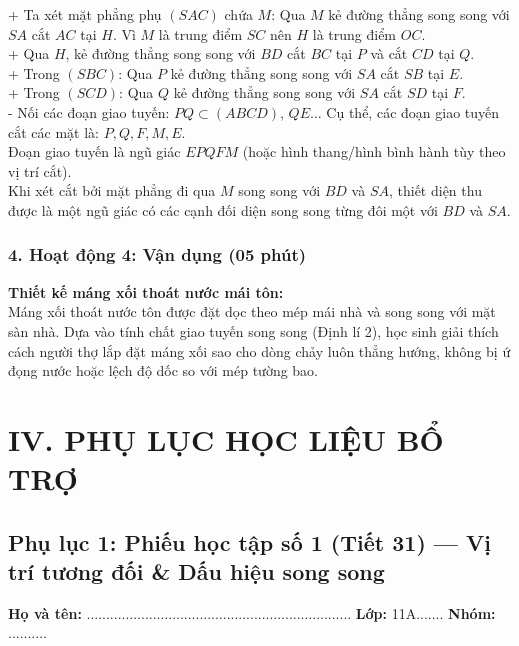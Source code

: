 \documentclass[12pt, a4paper]{article}
\begin{document}
\begin{itemize}
      + Ta xét mặt phẳng phụ $(SAC)$ chứa $M$: Qua $M$ kẻ đường thẳng song song với $SA$ cắt $AC$ tại $H$. Vì $M$ là trung điểm $SC$ nên $H$ là trung điểm $OC$.\\
      + Qua $H$, kẻ đường thẳng song song với $BD$ cắt $BC$ tại $P$ và cắt $CD$ tại $Q$.\\
      + Trong $(SBC)$: Qua $P$ kẻ đường thẳng song song với $SA$ cắt $SB$ tại $E$.\\
      + Trong $(SCD)$: Qua $Q$ kẻ đường thẳng song song với $SA$ cắt $SD$ tại $F$.\\
    - Nối các đoạn giao tuyến: $PQ \subset (ABCD)$, $QE \dots$ Cụ thể, các đoạn giao tuyến cắt các mặt là: $P, Q, F, M, E$.\\
    Đoạn giao tuyến là ngũ giác $EPQFM$ (hoặc hình thang/hình bình hành tùy theo vị trí cắt).\\
    Khi xét cắt bởi mặt phẳng đi qua $M$ song song với $BD$ và $SA$, thiết diện thu được là một ngũ giác có các cạnh đối diện song song từng đôi một với $BD$ và $SA$.
\end{itemize}

\subsubsection*{4. Hoạt động 4: Vận dụng (05 phút)}
\textbf{Thiết kế máng xối thoát nước mái tôn:}\\
Máng xối thoát nước tôn được đặt dọc theo mép mái nhà và song song với mặt sàn nhà. Dựa vào tính chất giao tuyến song song (Định lí 2), học sinh giải thích cách người thợ lắp đặt máng xối sao cho dòng chảy luôn thẳng hướng, không bị ứ đọng nước hoặc lệch độ dốc so với mép tường bao.

\newpage

\section*{IV. PHỤ LỤC HỌC LIỆU BỔ TRỢ}

\subsection*{Phụ lục 1: Phiếu học tập số 1 (Tiết 31) --- Vị trí tương đối \& Dấu hiệu song song}
\noindent\textbf{Họ và tên:} .................................................................... \textbf{Lớp:} 11A....... \textbf{Nhóm:} ..........
\end{document}
